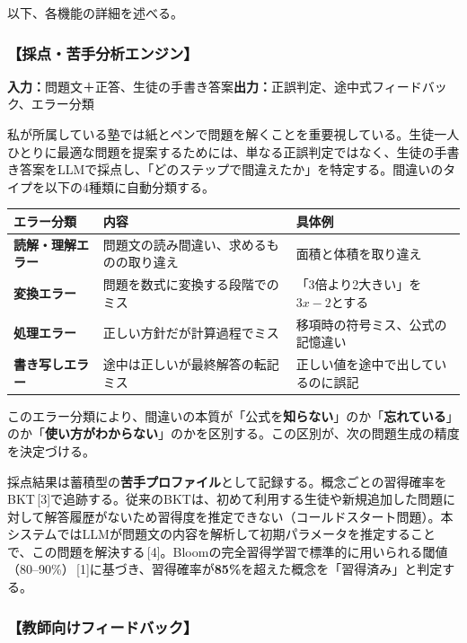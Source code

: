 \documentclass[paper=a4,fontsize=10.5bp,jafontsize=10.5bp,twocolumn]{jlreq}
\begin{document}
以下、各機能の詳細を述べる。

\subsubsection{【採点・苦手分析エンジン】}

\noindent\textbf{入力：}問題文＋正答、生徒の手書き答案\quad\textbf{出力：}正誤判定、途中式フィードバック、エラー分類

私が所属している塾では紙とペンで問題を解くことを重要視している。生徒一人ひとりに最適な問題を提案するためには、単なる正誤判定ではなく、生徒の手書き答案をLLMで採点し、「どのステップで間違えたか」を特定する。間違いのタイプを以下の4種類に自動分類する。

\begin{scriptsize}\noindent
\begin{tabularx}{\linewidth}{>{\bfseries}l X X}
\toprule
エラー分類 & 内容 & 具体例 \\
\midrule
読解・理解エラー & 問題文の読み間違い、求めるものの取り違え & 面積と体積を取り違え \\
変換エラー & 問題を数式に変換する段階でのミス & 「3倍より2大きい」を$3x-2$とする \\
処理エラー & 正しい方針だが計算過程でミス & 移項時の符号ミス、公式の記憶違い \\
書き写しエラー & 途中は正しいが最終解答の転記ミス & 正しい値を途中で出しているのに誤記 \\
\bottomrule
\end{tabularx}
\end{scriptsize}

このエラー分類により、間違いの本質が「公式を\textbf{知らない}」のか「\textbf{忘れている}」のか「\textbf{使い方がわからない}」のかを区別する。この区別が、次の問題生成の精度を決定づける。

採点結果は蓄積型の\textbf{苦手プロファイル}として記録する。概念ごとの習得確率をBKT\,[3]で追跡する。従来のBKTは、初めて利用する生徒や新規追加した問題に対して解答履歴がないため習得度を推定できない（コールドスタート問題）。本システムではLLMが問題文の内容を解析して初期パラメータを推定することで、この問題を解決する\,[4]。Bloomの完全習得学習で標準的に用いられる閾値（80--90\%）\,[1]に基づき、習得確率が\textbf{85\%}を超えた概念を「習得済み」と判定する。

\subsubsection{【教師向けフィードバック】}
\end{document}
